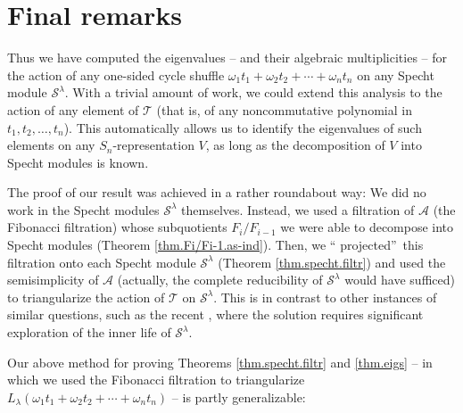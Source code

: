 \documentclass[numbers=enddot,12pt,final,onecolumn,notitlepage]{scrartcl}%
\theoremstyle{definition}
\begin{document}
\section{Final remarks}

Thus we have computed the eigenvalues -- and their algebraic multiplicities --
for the action of any one-sided cycle shuffle $\omega_{1}t_{1}+\omega_{2}%
t_{2}+\cdots+\omega_{n}t_{n}$ on any Specht module $\mathcal{S}^{\lambda}$.
With a trivial amount of work, we could extend this analysis to the action of
any element of $\mathcal{T}$ (that is, of any noncommutative polynomial in
$t_{1},t_{2},\ldots,t_{n}$). This automatically allows us to identify the
eigenvalues of such elements on any $S_{n}$-representation $V$, as long as the
decomposition of $V$ into Specht modules is known.

The proof of our result was achieved in a rather roundabout way: We did no
work in the Specht modules $\mathcal{S}^{\lambda}$ themselves. Instead, we
used a filtration of $\mathcal{A}$ (the Fibonacci filtration) whose
subquotients $F_{i}/F_{i-1}$ we were able to decompose into Specht modules
(Theorem \ref{thm.Fi/Fi-1.as-ind}). Then, we \textquotedblleft
projected\textquotedblright\ this filtration onto each Specht module
$\mathcal{S}^{\lambda}$ (Theorem \ref{thm.specht.filtr}) and used the
semisimplicity of $\mathcal{A}$ (actually, the complete reducibility of
$\mathcal{S}^{\lambda}$ would have sufficed) to triangularize the action of
$\mathcal{T}$ on $\mathcal{S}^{\lambda}$. This is in contrast to other
instances of similar questions, such as the recent \cite{2407.08644}, where
the solution requires significant exploration of the inner life of
$\mathcal{S}^{\lambda}$.

Our above method for proving Theorems \ref{thm.specht.filtr} and
\ref{thm.eigs} -- in which we used the Fibonacci filtration to triangularize
$L_{\lambda}\left(  \omega_{1}t_{1}+\omega_{2}t_{2}+\cdots+\omega_{n}%
t_{n}\right)  $ -- is partly generalizable:
\end{document}
